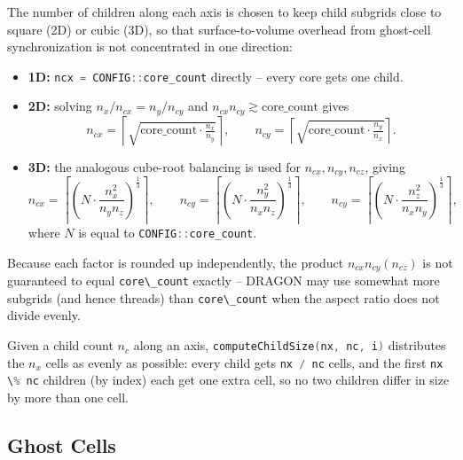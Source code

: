 \documentclass[11pt]{report}
\newcommand{\cpp}[1]{\lstinline[language=C++]{#1}}
\begin{document}
The number of children along each axis is chosen to keep child subgrids close to square (2D) or cubic (3D), so that surface-to-volume overhead from ghost-cell synchronization is not concentrated in one direction:
\begin{itemize}
\item \textbf{1D:} \cpp{ncx = CONFIG::core_count} directly -- every core gets one child.
\item \textbf{2D:} solving $n_x/n_{cx} = n_y/n_{cy}$ and $n_{cx} n_{cy} \gtrsim \mathrm{core\_count}$ gives
\begin{equation}
n_{cx} = \left\lceil \sqrt{\text{core\_count} \cdot \tfrac{n_x}{n_y}} \right\rceil, \qquad
n_{cy} = \left\lceil \sqrt{\text{core\_count} \cdot \tfrac{n_y}{n_x}} \right\rceil.
\end{equation}
\item \textbf{3D:} the analogous cube-root balancing is used for $n_{cx}, n_{cy}, n_{cz}$, giving
\begin{equation}
n_{cx} = \left\lceil \left(N \cdot \frac{n_x^2}{n_yn_z}\right)^{\frac13} \right\rceil, \qquad
n_{cy} = \left\lceil \left(N \cdot \frac{n_y^2}{n_xn_z}\right)^{\frac13} \right\rceil, \qquad
n_{cy} = \left\lceil \left(N\cdot \frac{n_z^2}{n_xn_y}\right)^{\frac13} \right\rceil,
\end{equation}
where $N$ is equal to \cpp{CONFIG::core_count}.
\end{itemize}
Because each factor is rounded up independently, the product $n_{cx} n_{cy}(n_{cz})$ is not guaranteed to equal \cpp{core\_count} exactly -- DRAGON may use somewhat more subgrids (and hence threads) than \cpp{core\_count} when the aspect ratio does not divide evenly.

Given a child count $n_c$ along an axis, \cpp{computeChildSize(nx, nc, i)} distributes the $n_x$ cells as evenly as possible: every child gets \cpp{nx / nc} cells, and the first \cpp{nx \% nc} children (by index) each get one extra cell, so no two children differ in size by more than one cell.

\subsection{Ghost Cells}
\end{document}
